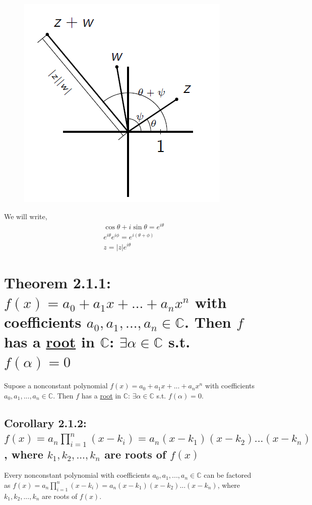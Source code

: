 \documentclass[11pt]{elegantbook}
\begin{document}
\begin{center}\begin{figure}[htbp]
    \centering
    \includegraphics[scale=0.8]{Complex multiplication.png}
\end{figure}\end{center}
We will write,
\begin{equation}
    \begin{aligned}
        &\cos \theta+i\sin\theta=e^{i\theta}\\
        &e^{i\theta}e^{i\phi}=e^{i(\theta+\phi)}\\
        &z=|z|e^{i\theta}
    \end{aligned}
    \nonumber
\end{equation}
\section{Theorem 2.1.1: $f(x)=a_0+a_1x+...+a_nx^n$ with coefficients $a_0,a_1,...,a_n\in\mathbb{C}$. Then $f$ has a \underline{root} in $\mathbb{C}$: $\exists \alpha\in\mathbb{C}$ s.t. $f(\alpha)=0$}
\begin{theorem}[Theorem 2.1.1]
Supose a nonconstant polynomial $f(x)=a_0+a_1x+...+a_nx^n$ with coefficients $a_0,a_1,...,a_n\in\mathbb{C}$. Then $f$ has a \underline{root} in $\mathbb{C}$: $\exists \alpha\in\mathbb{C}$ s.t. $f(\alpha)=0$.
\end{theorem}
\subsection{Corollary 2.1.2: $f(x)=a_n\prod_{i=1}^n(x-k_i)=a_n(x-k_1)(x-k_2)...(x-k_n)$, where $k_1,k_2,...,k_n$ are roots of $f(x)$}
\begin{corollary}[Corollary 2.1.2]
    Every nonconstant polynomial with coefficients $a_0,a_1,...,a_n\in\mathbb{C}$ can be factored as $f(x)=a_n\prod_{i=1}^n(x-k_i)=a_n(x-k_1)(x-k_2)...(x-k_n)$, where $k_1,k_2,...,k_n$ are roots of $f(x)$.
\end{corollary}
\end{document}

